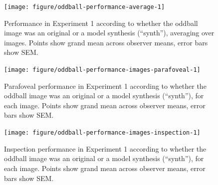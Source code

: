 \documentclass[article, 11pt,a4paper,natbib]{apa6}\usepackage[]{graphicx}\usepackage[]{color}
\newenvironment{knitrout}{}{} %
\begin{document}
\begin{knitrout}
\color{fgcolor}\begin{figure}
\texttt{[image: figure/oddball-performance-average-1]} \caption[Performance in Experiment 1 according to whether the oddball image was an original or a model synthesis (``synth''), averaging over
images]{Performance in Experiment 1 according to whether the oddball image was an original or a model synthesis (``synth''), averaging over
images. Points show grand mean across observer means, error bars show SEM.}\label{fig:oddball-performance-average}
\end{figure}


\end{knitrout}



\begin{knitrout}
\color{fgcolor}\begin{figure}
\texttt{[image: figure/oddball-performance-images-parafoveal-1]} \caption[Parafoveal performance in Experiment 1 according to whether the oddball image was an original or a model synthesis (``synth''), for each image.
        Points show grand mean across observer means, error bars show SEM]{Parafoveal performance in Experiment 1 according to whether the oddball image was an original or a model synthesis (``synth''), for each image.
        Points show grand mean across observer means, error bars show SEM.}\label{fig:oddball-performance-images-parafoveal}
\end{figure}


\end{knitrout}




\begin{knitrout}
\color{fgcolor}\begin{figure}
\texttt{[image: figure/oddball-performance-images-inspection-1]} \caption[Inspection performance in Experiment 1 according to whether the oddball image was an original or a model synthesis (``synth''), for each image.
        Points show grand mean across observer means, error bars show SEM]{Inspection performance in Experiment 1 according to whether the oddball image was an original or a model synthesis (``synth''), for each image.
        Points show grand mean across observer means, error bars show SEM.}\label{fig:oddball-performance-images-inspection}
\end{figure}


\end{knitrout}
\end{document}
